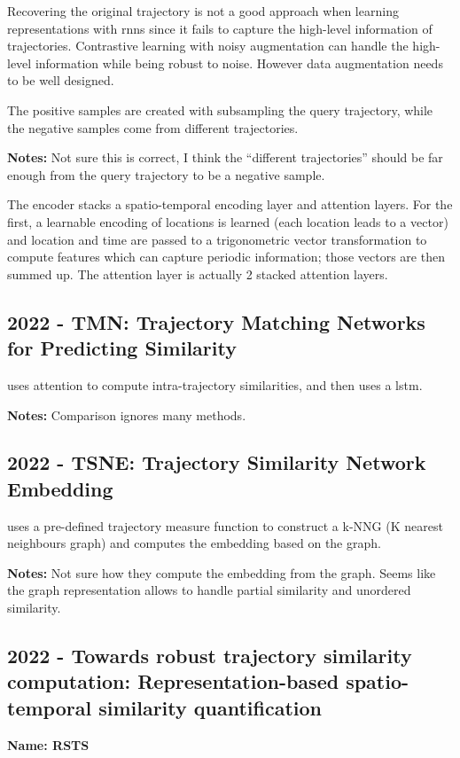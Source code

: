 Recovering the original trajectory is not a good approach when learning representations with \glspl{rnn} since it fails to capture the high-level information of trajectories. Contrastive learning with noisy augmentation can handle the high-level information while being robust to noise. However data augmentation needs to be well designed. 

The positive samples are created with subsampling the query trajectory, while the negative samples come from different trajectories.

\textbf{Notes:} Not sure this is correct, I think the ``different trajectories'' should be far enough from the query trajectory to be a negative sample.

The encoder stacks a spatio-temporal encoding layer and attention layers. For the first, a learnable encoding of locations is learned (each location leads to a vector) and location and time are passed to a trigonometric vector transformation to compute features which can capture periodic information; those vectors are then summed up. The attention layer is actually 2 stacked attention layers.


\subsection*{2022 - TMN: Trajectory Matching Networks for Predicting Similarity}
\cite{yang2022tmn} uses attention to compute intra-trajectory similarities, and then uses a \gls{lstm}.

\textbf{Notes:} Comparison ignores many methods.

\subsection*{2022 - TSNE: Trajectory Similarity Network Embedding}
\cite{ding2022tsne} uses a pre-defined trajectory measure function to construct a k-NNG (K nearest neighbours graph) and computes the embedding based on the graph.

\textbf{Notes:} Not sure how they compute the embedding from the graph. Seems like the graph representation allows to handle partial similarity and unordered similarity.

\subsection*{2022 - Towards robust trajectory similarity computation: Representation-based spatio-temporal similarity quantification}
\textbf{Name: RSTS} 

